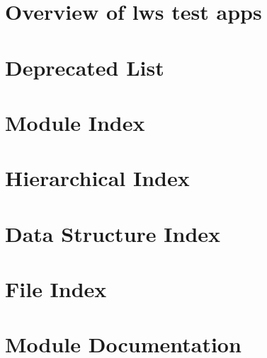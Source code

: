 \documentclass[twoside]{book}
\newcommand{\+}{\discretionary{\mbox{\scriptsize$\hookleftarrow$}}{}{}}
\begin{document}
\chapter{Overview of lws test apps}
\label{md_README.test-apps}
\hypertarget{md_README.test-apps}{}

\chapter{Deprecated List}
\label{deprecated}
\hypertarget{deprecated}{}

\chapter{Module Index}

\chapter{Hierarchical Index}

\chapter{Data Structure Index}

\chapter{File Index}

\chapter{Module Documentation}































\end{document}
